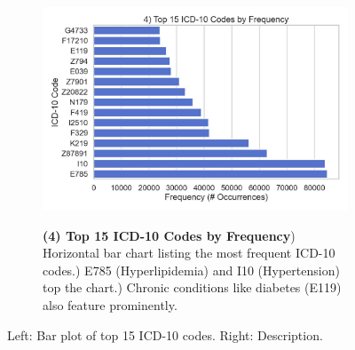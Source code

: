 \documentclass[12pt,a4paper]{report}
\begin{document}
\begin{figure}[ht!]
    \centering
    \begin{subfigure}{0.42\textwidth}
        \includegraphics[width=\linewidth]{mimic_plots/plot4.jpg}
    \end{subfigure}\hfill
    \begin{subfigure}{0.54\textwidth}
        \footnotesize
        \textbf{(4) Top 15 ICD-10 Codes by Frequency}) Horizontal bar chart listing the most frequent ICD-10 codes.) E785 (Hyperlipidemia) and I10 (Hypertension) top the chart.) Chronic conditions like diabetes (E119) also feature prominently.
    \end{subfigure}
    \caption{Left: Bar plot of top 15 ICD-10 codes. Right: Description.}
    \label{fig:plot4}
\end{figure}
\end{document}
